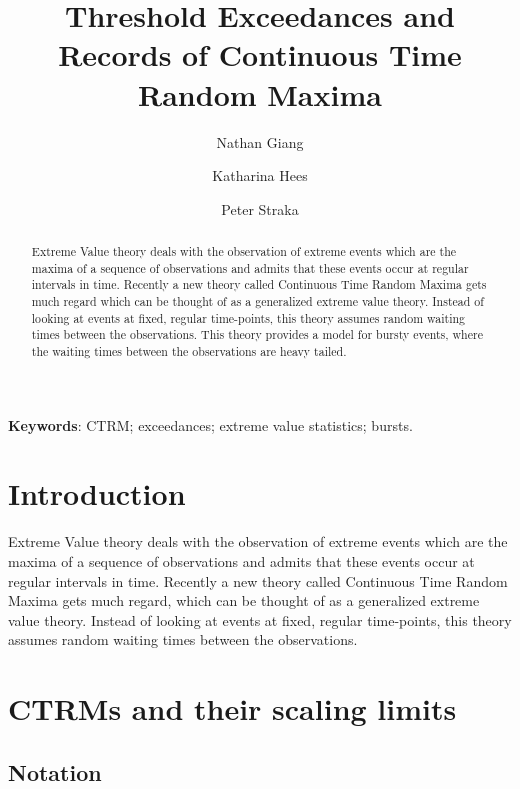 \documentclass[12pt]{article}
\title{Threshold Exceedances and Records of Continuous Time Random Maxima}
\author{Nathan Giang \and Katharina Hees \and Peter Straka}
\newcommand{\1}{\mathbf 1}
\begin{document}
\maketitle

\begin{abstract}
Extreme Value theory deals with the observation of extreme events which are the maxima of a sequence of observations and admits that these events occur at regular intervals in time. Recently a new theory called Continuous Time Random Maxima gets much regard which can be thought of as a generalized extreme value theory. Instead of looking at events at fixed, regular time-points, this theory assumes random waiting times between the observations. This theory provides a model for bursty events, where the waiting times between the observations are heavy tailed.\\

\end{abstract}

{\bf Keywords}: CTRM; exceedances; extreme value statistics; bursts.


\setlength{\parindent}{0pt}

\section{Introduction}
Extreme Value theory deals with the observation of extreme events which are the maxima of a sequence of observations and admits that these events occur at regular intervals in time. Recently a new theory called Continuous Time Random Maxima gets much regard, which can be thought of as a generalized extreme value theory. Instead of looking at events at fixed, regular time-points, this theory assumes random waiting times between the observations.


\section{CTRMs and their scaling limits}

\subsection{Notation}
\end{document}
